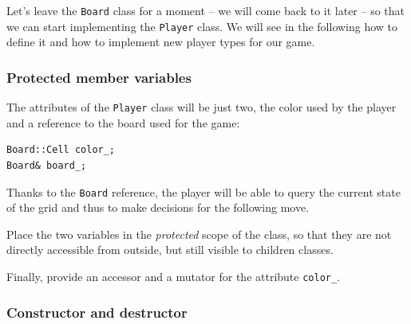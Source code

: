 \documentclass{article}
\begin{document}
Let's leave the \texttt{Board} class for a moment -- we will come back to it later -- so that we can start implementing the \texttt{Player} class. We will see in the following how to define it and how to implement new player types for our game.


\subsubsection{Protected member variables}

The attributes of the \texttt{Player} class will be just two, the color used by the player and a reference to the board used for the game:
\begin{center}
\begin{minipage}{.9\textwidth}
\begin{lstlisting}[style=mycpp,numbers=none]
Board::Cell color_;
Board& board_;
\end{lstlisting}
\end{minipage}
\end{center}
Thanks to the \texttt{Board} reference, the player will be able to query the current state of the grid and thus to make decisions for the following move.

Place the two variables in the \emph{protected} scope of the class, so that they are not directly accessible from outside, but still visible to children classes.

Finally, provide an accessor and a mutator for the attribute \texttt{color\_}.


\subsubsection{Constructor and destructor}
\end{document}
